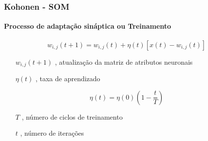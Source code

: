 \documentclass[aspectratio=10]{beamer} %
\begin{document}
%	
%



\begin{frame}
	\frametitle{Kohonen - SOM}
	\framesubtitle{Processo de adaptação sináptica ou Treinamento}
	
	\begin{tcolorbox}[colback=gray!5,colframe=blue!40!black,title=Definição]
		\begin{equation}
		w_{i,j}(t+1)=w_{i,j}(t)+\eta(t)[x(t)-w_{i,j}(t)] \nonumber
		\label{eq2}
		\end{equation}  
	\end{tcolorbox}
	
	\pause
	
	\begin{itemize}
		\centering
		\item[$w_{i,j}(t+1)$],  atualização da matriz de atributos neuronais
		\item[$\eta(t)$], taxa de aprendizado
	\end{itemize}
	\pause
	\begin{tcolorbox}[colback=gray!5,colframe=blue!40!black,title=Definição]
		\begin{equation}
		\eta(t)=\eta(0)    ( 1 -  \frac{t}{T}  ) \nonumber
		\label{eq3}
		\end{equation}  
	\end{tcolorbox}
	
	\begin{itemize}
		\centering
		\item[$T$], número de ciclos de treinamento
		\item[$t$], número de iterações
	\end{itemize}
	
	
\end{frame}
\end{document}
